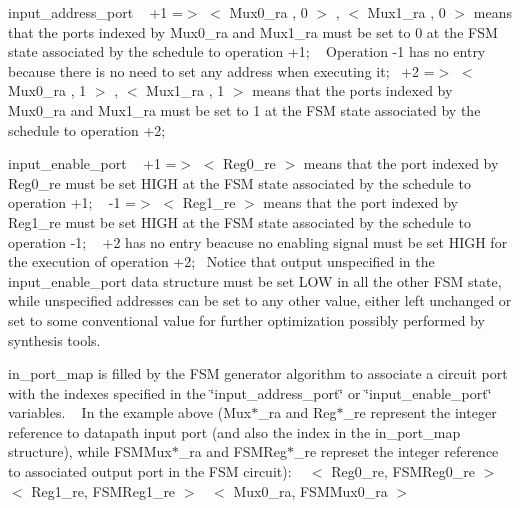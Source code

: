 \begin{DoxyItemize}
\item input\+\_\+address\+\_\+port ~\newline
+1 =$>$ $<$ Mux0\+\_\+ra , 0 $>$ , $<$ Mux1\+\_\+ra , 0 $>$ means that the ports indexed by Mux0\+\_\+ra and Mux1\+\_\+ra must be set to 0 at the F\+SM state associated by the schedule to operation +1; ~\newline
Operation -\/1 has no entry because there is no need to set any address when executing it;~\newline
+2 =$>$ $<$ Mux0\+\_\+ra , 1 $>$ , $<$ Mux1\+\_\+ra , 1 $>$ means that the ports indexed by Mux0\+\_\+ra and Mux1\+\_\+ra must be set to 1 at the F\+SM state associated by the schedule to operation +2; ~\newline

\item input\+\_\+enable\+\_\+port ~\newline
+1 =$>$ $<$ Reg0\+\_\+re $>$ means that the port indexed by Reg0\+\_\+re must be set H\+I\+GH at the F\+SM state associated by the schedule to operation +1; ~\newline
-\/1 =$>$ $<$ Reg1\+\_\+re $>$ means that the port indexed by Reg1\+\_\+re must be set H\+I\+GH at the F\+SM state associated by the schedule to operation -\/1; ~\newline
+2 has no entry beacuse no enabling signal must be set H\+I\+GH for the execution of operation +2;~\newline
Notice that output unspecified in the input\+\_\+enable\+\_\+port data structure must be set L\+OW in all the other F\+SM state, while unspecified addresses can be set to any other value, either left unchanged or set to some conventional value for further optimization possibly performed by synthesis tools.~\newline

\item in\+\_\+port\+\_\+map is filled by the F\+SM generator algorithm to associate a circuit port with the indexes specified in the \char`\"{}input\+\_\+address\+\_\+port\char`\"{} or \char`\"{}input\+\_\+enable\+\_\+port\char`\"{} variables. ~\newline
In the example above (Mux$\ast$\+\_\+ra and Reg$\ast$\+\_\+re represent the integer reference to datapath input port (and also the index in the in\+\_\+port\+\_\+map structure), while F\+S\+M\+Mux$\ast$\+\_\+ra and F\+S\+M\+Reg$\ast$\+\_\+re represet the integer reference to associated output port in the F\+SM circuit)\+: ~\newline
$<$ Reg0\+\_\+re, F\+S\+M\+Reg0\+\_\+re $>$~\newline
$<$ Reg1\+\_\+re, F\+S\+M\+Reg1\+\_\+re $>$~\newline
$<$ Mux0\+\_\+ra, F\+S\+M\+Mux0\+\_\+ra $>$~\newline


\end{DoxyItemize}
